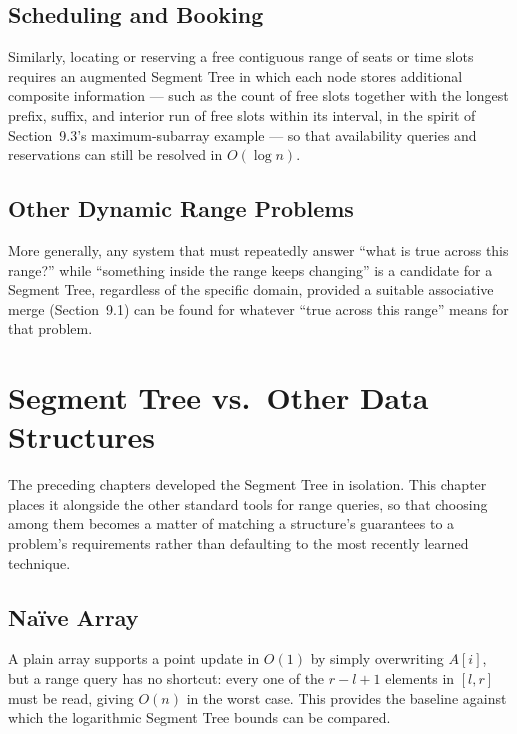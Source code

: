 \documentclass[
  11pt,
  a4paper,
  twoside=false,
  numbers=noenddot,
  headings=big,
  parskip=half,
  toc=bibliography,
  toc=listof,
  bibliography=totoc
]{scrreprt}
\newcounter{example}[chapter]
\newcommand{\Oh}[1]{O\!\left(#1\right)}
\begin{document}
\section{Scheduling and Booking}
Similarly, locating or reserving a free contiguous range of seats or time slots requires an augmented Segment Tree in which each node stores additional composite information --- such as the count of free slots together with the longest prefix, suffix, and interior run of free slots within its interval, in the spirit of Section~9.3's maximum-subarray example --- so that availability queries and reservations can still be resolved in $\Oh{\log n}$.

\section{Other Dynamic Range Problems}
More generally, any system that must repeatedly answer ``what is true across this range?'' while ``something inside the range keeps changing'' is a candidate for a Segment Tree, regardless of the specific domain, provided a suitable associative merge (Section~9.1) can be found for whatever ``true across this range'' means for that problem.




\chapter{Segment Tree vs.\ Other Data Structures}
\label{ch:comparison}

The preceding chapters developed the Segment Tree in isolation. This chapter places it alongside the other standard tools for range queries, so that choosing among them becomes a matter of matching a structure's guarantees to a problem's requirements rather than defaulting to the most recently learned technique.

\section{Na\"ive Array}
A plain array supports a point update in $\Oh{1}$ by simply overwriting $A[i]$, but a range query has no shortcut: every one of the $r-l+1$ elements in $[l,r]$ must be read, giving $\Oh{n}$ in the worst case. This provides the baseline against which the logarithmic Segment Tree bounds can be compared.
\end{document}
